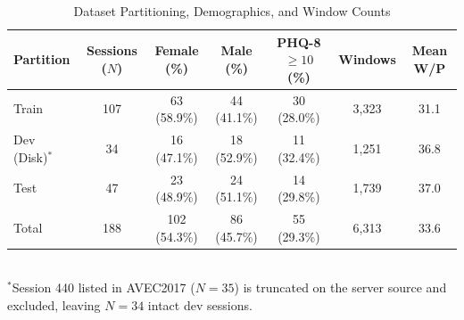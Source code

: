\begin{table}[t]
\centering
\small
\caption{Dataset Partitioning, Demographics, and Window Counts}
\label{tab:dataset_splits}
\begin{tabular}{lcccccc}
\toprule
\textbf{Partition} & \textbf{Sessions ($N$)} & \textbf{Female (\%)} & \textbf{Male (\%)} & \textbf{PHQ-8 $\ge 10$ (\%)} & \textbf{Windows} & \textbf{Mean W/P} \\
\midrule
Train & 107 & 63 (58.9\%) & 44 (41.1\%) & 30 (28.0\%) & 3,323 & 31.1 \\
Dev (Disk)$^*$ & 34 & 16 (47.1\%) & 18 (52.9\%) & 11 (32.4\%) & 1,251 & 36.8 \\
Test & 47 & 23 (48.9\%) & 24 (51.1\%) & 14 (29.8\%) & 1,739 & 37.0 \\
\midrule
Total & 188 & 102 (54.3\%) & 86 (45.7\%) & 55 (29.3\%) & 6,313 & 33.6 \\
\bottomrule
\end{tabular}
\\[2pt]
\footnotesize{$^*$Session 440 listed in AVEC2017 ($N=35$) is truncated on the server source and excluded, leaving $N=34$ intact dev sessions.}
\end{table}
